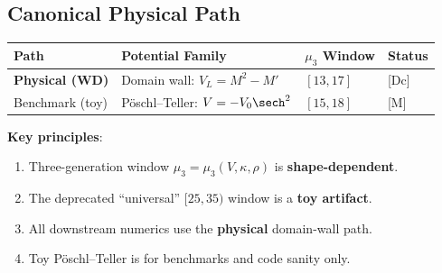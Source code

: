 \subsection*{Canonical Physical Path}

\begin{center}
\begin{tabular}{@{}llll@{}}
\toprule
Path & Potential Family & $\mu_3$ Window & Status \\
\midrule
\textbf{Physical (WD)} & Domain wall: $V_L = M^2 - M'$ & $[13, 17]$ & [Dc] \\
Benchmark (toy) & P\"oschl--Teller: $V = -V_0 \sech^2$ & $[15, 18]$ & [M] \\
\bottomrule
\end{tabular}
\end{center}

\textbf{Key principles}:
\begin{enumerate}[nosep]
    \item Three-generation window $\mu_3 = \mu_3(V, \kappa, \rho)$ is \textbf{shape-dependent}.
    \item The deprecated ``universal'' $[25, 35)$ window is a \textbf{toy artifact}.
    \item All downstream numerics use the \textbf{physical} domain-wall path.
    \item Toy P\"oschl--Teller is for benchmarks and code sanity only.
\end{enumerate}

